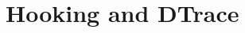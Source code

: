 \documentclass{report}
\begin{document}
\section{Hooking and DTrace}
\label{sec:detection:hooking-and-dtrace}

\end{document}
